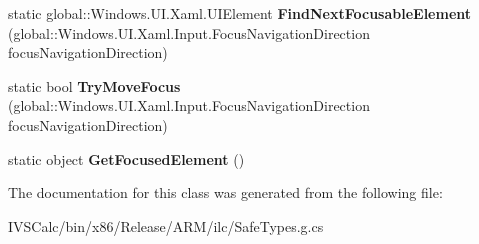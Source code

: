 \begin{DoxyCompactItemize}
static global\+::\+Windows.\+U\+I.\+Xaml.\+U\+I\+Element {\bfseries Find\+Next\+Focusable\+Element} (global\+::\+Windows.\+U\+I.\+Xaml.\+Input.\+Focus\+Navigation\+Direction focus\+Navigation\+Direction)
\item 
\mbox{\label{class_windows_1_1_u_i_1_1_xaml_1_1_input_1_1_focus_manager_ab563de83db92e54ea87ab66f08208a6c}} 
static bool {\bfseries Try\+Move\+Focus} (global\+::\+Windows.\+U\+I.\+Xaml.\+Input.\+Focus\+Navigation\+Direction focus\+Navigation\+Direction)
\item 
\mbox{\label{class_windows_1_1_u_i_1_1_xaml_1_1_input_1_1_focus_manager_a5fac98429232cfe24747a7f58343840d}} 
static object {\bfseries Get\+Focused\+Element} ()
\end{DoxyCompactItemize}


The documentation for this class was generated from the following file\+:\begin{DoxyCompactItemize}
\item 
I\+V\+S\+Calc/bin/x86/\+Release/\+A\+R\+M/ilc/Safe\+Types.\+g.\+cs\end{DoxyCompactItemize}
